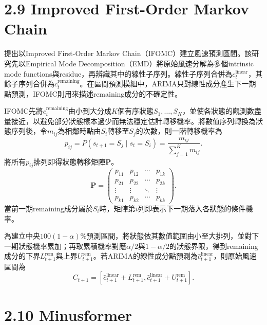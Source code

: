 \section*{2.9 Improved First-Order Markov Chain}

\cite{dingmeng2020}提出以Improved First-Order Markov Chain（IFOMC）建立風速預測區間。該研究先以Empirical Mode Decomposition（EMD）將原始風速分解為多個intrinsic mode functions與residue，再辨識其中的線性子序列。線性子序列合併為$c_t^{\mathrm{linear}}$，其餘子序列合併為$c_t^{\mathrm{remaining}}$。在區間預測模組中，ARIMA只對線性成分產生下一期點預測，IFOMC則用來描述remaining成分的不確定性。

IFOMC先將$c_t^{\mathrm{remaining}}$由小到大分成$K$個有序狀態$S_1,\ldots,S_K$，並使各狀態的觀測數盡量接近，以避免部分狀態樣本過少而無法穩定估計轉移機率。將數值序列轉換為狀態序列後，令$m_{ij}$為相鄰時點由$S_i$轉移至$S_j$的次數，則一階轉移機率為
\begin{equation}
 p_{ij}=P(s_{t+1}=S_j\mid s_t=S_i)
 =\frac{m_{ij}}{\sum_{j=1}^{K}m_{ij}}.
\end{equation}
將所有$p_{ij}$排列即得狀態轉移矩陣$\boldsymbol P$。
\begin{equation}
\mathbf{P}
=
\begin{pmatrix}
p_{11} & p_{12} & \cdots & p_{1k}\\
p_{21} & p_{22} & \cdots & p_{2k}\\
\vdots & \vdots & \ddots & \vdots\\
p_{k1} & p_{k2} & \cdots & p_{kk}
\end{pmatrix}.
\end{equation}
當前一期remaining成分屬於$S_i$時，矩陣第$i$列即表示下一期落入各狀態的條件機率。

為建立中央$100(1-\alpha)\%$預測區間，將狀態依其數值範圍由小至大排列，並對下一期狀態機率累加；再取累積機率對應$\alpha/2$與$1-\alpha/2$的狀態界限，得到remaining成分的下界$L_{t+1}^{\mathrm{rem}}$與上界$U_{t+1}^{\mathrm{rem}}$。若ARIMA的線性成分點預測為$\widehat c_{t+1}^{\mathrm{linear}}$，則原始風速區間為
\begin{equation}
 C_{t+1}=\left[
 \widehat c_{t+1}^{\mathrm{linear}}+L_{t+1}^{\mathrm{rem}},
 \widehat c_{t+1}^{\mathrm{linear}}+U_{t+1}^{\mathrm{rem}}
 \right].
\end{equation}

\section*{2.10 Minusformer}


